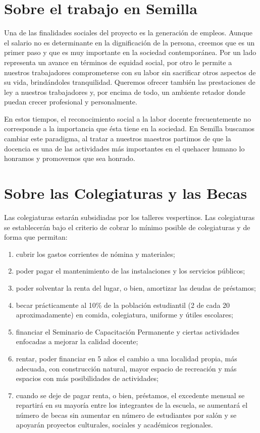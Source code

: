\documentclass[10pt,letterpaper,oneside]{book}
\begin{document}
\section{Sobre el trabajo en Semilla}
Una de las finalidades sociales del proyecto es la generación de empleos. Aunque el salario no es determinante en la dignificación de la persona, creemos que es un primer paso y que es muy importante en la sociedad contemporánea. Por un lado representa un avance en términos de equidad social, por otro le permite a nuestros trabajadores comprometerse con su labor sin sacrificar otros aspectos de su vida, brindándoles tranquilidad. Queremos ofrecer también las prestaciones de ley a nuestros trabajadores y, por encima de todo, un ambiente retador donde puedan crecer profesional y personalmente.

En estos tiempos, el reconocimiento social a la labor docente frecuentemente no corresponde a la importancia que ésta tiene en la sociedad. En Semilla buscamos cambiar este paradigma, al tratar a nuestros maestros partimos de que la docencia es una de las actividades más importantes en el quehacer humano lo honramos y promovemos que sea honrado.

\section{Sobre las Colegiaturas y las Becas}

Las colegiaturas estarán subsidiadas por los talleres vespertinos. Las colegiaturas se establecerán bajo el criterio de cobrar lo mínimo posible de colegiaturas y de forma que permitan:
\begin{enumerate}
\item cubrir los gastos corrientes de nómina y materiales;
\item poder pagar el mantenimiento de las instalaciones y los servicios públicos;
\item poder solventar la renta del lugar, o bien, amortizar las deudas de préstamos;
\item becar prácticamente al 10\% de la población estudiantil (2 de cada 20 aproximadamente) en comida, colegiatura, uniforme y útiles escolares;
\item financiar el Seminario de Capacitación Permanente y ciertas actividades enfocadas a mejorar la calidad docente;
\item rentar, poder financiar en 5 años el cambio a una localidad propia, más adecuada, con construcción natural, mayor espacio de recreación y más espacios con más posibilidades de actividades;
\item cuando se deje de pagar renta, o bien, préstamos, el excedente mensual se repartirá en su mayoría entre los integrantes de la escuela, se aumentará el número de becas sin aumentar en número de estudiantes por salón y se apoyarán proyectos culturales, sociales y académicos regionales.
\end{enumerate}
\end{document}
